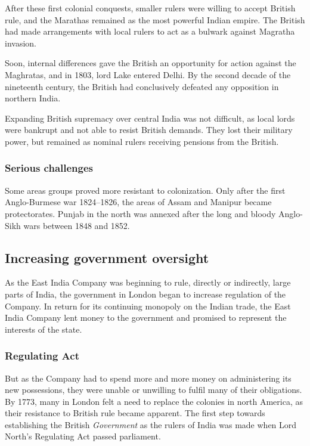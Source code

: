 \documentclass[11pt, a4paper, headings=standardclasses]{scrartcl}
\begin{document}
After these first colonial conquests, smaller rulers were willing to accept British rule\autocite[Chapter 4, sections 8 and 9]{RF}, and the Marathas remained as the most powerful Indian empire. The British had made arrangements with local rulers to act as a bulwark against Magratha invasion.\autocite[273]{RF}

Soon, internal differences gave the British an opportunity for action against the Magh\-ratas, and in 1803, lord Lake entered Delhi. By the second decade of the nineteenth century, the British had conclusively defeated any opposition in northern India.\autocite[274]{RF}

Expanding British supremacy over central India was not difficult, as local lords were bankrupt and not able to resist British demands. They lost their military power, but remained as nominal rulers receiving pensions from the British.\autocite[276]{RF}

\subsubsection{Serious challenges}

Some areas groups proved more resistant to colonization. Only after the first Anglo-Burmese war 1824--1826, the areas of Assam and Manipur became protectorates. Punjab in the north was annexed after the long and bloody Anglo-Sikh wars between 1848 and 1852.\autocite[277]{RF}

\subsection{Increasing government oversight}

As the East India Company was beginning to rule, directly or indirectly, large parts of India, the government in London began to increase regulation of the Company. In return for its continuing monopoly on the Indian trade, the East India Company lent money to the government and promised to represent the interests of the state.\autocite[394]{RF, parliament}

\subsubsection{Regulating Act}

But as the Company had to spend more and more money on administering its new possessions, they were unable or unwilling to fulfil many of their obligations.\autocite[395]{RF} By 1773, many in London felt a need to replace the colonies in north America, as their resistance to British rule became apparent. The first step towards establishing the British \textit{Government} as the rulers of India was made when Lord North's Regulating Act passed parliament.\autocite[395]{RF, parliament}
\end{document}
